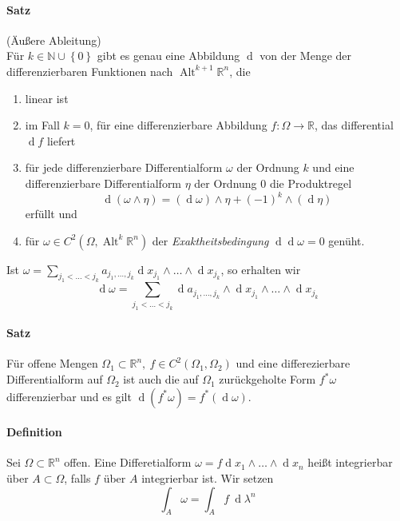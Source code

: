 \documentclass[12pt,a4paper,fleqn]{article}
\def\set#1{{\left\{ #1 \right\}}}
\def\R{{\mathbb{R}}}
\def\d{{\operatorname{d}}}
\begin{document}
\paragraph{Satz} (Äußere Ableitung)\\
Für $k\in \mathbb{N}\cup\set{0}$ gibt es genau eine Abbildung $\d$ von der Menge der differenzierbaren Funktionen nach $\operatorname{Alt}^{k+1} \R^n$, die
\begin{enumerate}
\item linear ist
\item im Fall $k=0$, für eine differenzierbare Abbildung $f\colon \Omega \rightarrow \R$, das differential $\d f$ liefert
\item für jede differenzierbare Differentialform $\omega$ der Ordnung $k$ und eine differenzierbare Differentialform $\eta$ der Ordnung $0$ die Produktregel
\begin{displaymath}
\d (\omega\wedge\eta) = (\d \omega) \wedge\eta + (-1)^k\wedge(\d \eta)
\end{displaymath}
erfüllt und
\item für $\omega \in C^2(\Omega, \operatorname{Alt}^k \R^n)$ der \textit{Exaktheitsbedingung} $\d\d \omega = 0$ genüht.
\end{enumerate}
Ist $\omega = \sum_{j_1 <\dots < j_k} a_{j_1, \dots, j_k}\d x_{j_1}\wedge\dots\wedge\d x_{j_k}$, so erhalten wir 
\begin{displaymath}
\d\omega = \sum_{j_1 < \dots < j_k}\d a_{j_1, \dots, j_k} \wedge\d x_{j_1}\wedge\dots\wedge\d x_{j_k}
\end{displaymath}

\paragraph{Satz} Für offene Mengen $\Omega_1\subset \R^n,\ f\in C^2(\Omega_1, \Omega_2)$ und eine differezierbare Differentialform auf $\Omega_2$ ist auch die auf $\Omega_1$ zurückgeholte Form $f^\ast\omega$ differenzierbar und es gilt $\d (f^\ast\omega)=f^\ast(\d \omega)$.

\paragraph{Definition} Sei $\Omega\subset \R^n$ offen. Eine Differetialform $\omega= f\d x_1\wedge\dots\wedge\d x_n$ heißt integrierbar über $A\subset\Omega$, falls $f$ über $A$ integrierbar ist. Wir setzen
\begin{displaymath}
\int_A \omega = \int_A f\ \d\lambda^n
\end{displaymath}
\end{document}
